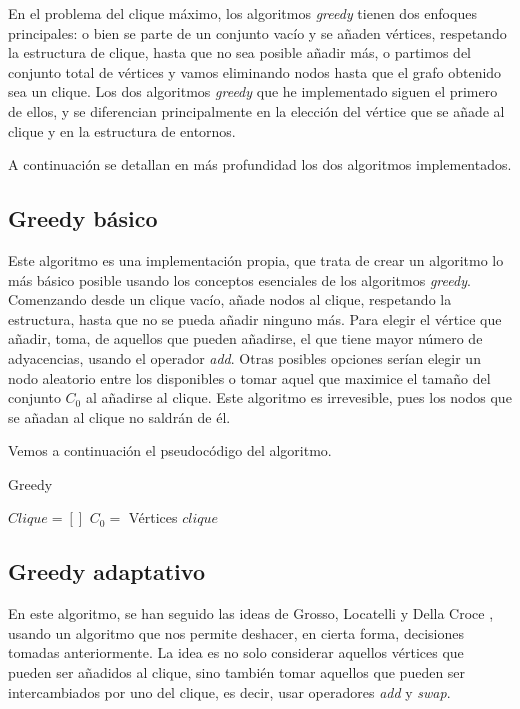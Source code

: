 En el problema del clique máximo, los algoritmos \textit{greedy} tienen dos enfoques principales:
o bien se parte de un conjunto vacío y se añaden vértices, respetando la estructura de clique,
hasta que no sea posible añadir más, o partimos del conjunto total de vértices y vamos eliminando
nodos hasta que el grafo obtenido sea un clique. Los dos algoritmos \textit{greedy} que he
implementado siguen el primero de ellos, y se diferencian principalmente en la elección del
vértice que se añade al clique y en la estructura de entornos.

A continuación se detallan en más profundidad los dos algoritmos implementados.

\subsection{Greedy básico}\label{greedy1}

Este algoritmo es una implementación propia, que trata de crear un algoritmo lo más
básico posible usando los conceptos esenciales de los algoritmos \textit{greedy}.
Comenzando desde un clique vacío, añade nodos al clique, respetando la estructura, hasta
que no se pueda añadir ninguno más. Para elegir el vértice que añadir, toma, de aquellos que
pueden añadirse, el que tiene mayor número de adyacencias, usando el operador \textit{add}.
Otras posibles opciones serían elegir un nodo aleatorio entre los disponibles o tomar aquel que
maximice el tamaño del conjunto $C_0$ al añadirse al clique. Este algoritmo es irrevesible,
pues los nodos que se añadan al clique no saldrán de él.

Vemos a continuación el pseudocódigo del algoritmo.

\begin{algorithm}[H]
\caption{Greedy}
  \begin{algorithmic}
  \State $Clique = [ ]$
  \State $C_0 = $ Vértices
  \Repeat
  \Return $clique$
  \EndFunction
  \end{algorithmic}
\end{algorithm}


\subsection{Greedy adaptativo}\label{greedy2}

En este algoritmo, se han seguido las ideas de Grosso, Locatelli y Della Croce
\citep{grosso:2004}, usando un algoritmo que nos permite deshacer, en cierta forma,
decisiones tomadas anteriormente. La idea es no solo considerar aquellos vértices
que pueden ser añadidos al clique, sino también tomar aquellos que pueden ser
intercambiados por uno del clique, es decir, usar operadores \textit{add} y \textit{swap}.

